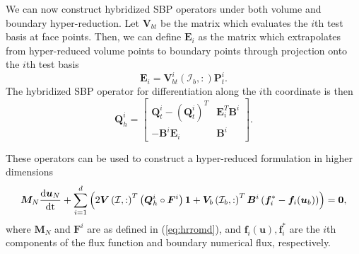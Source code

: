 \documentclass[review]{siamart171218}
\theoremstyle{assumption}
\newcommand{\td}[2]{\frac{{\rm d}#1}{{\rm d}{\rm #2}}}
\newcommand{\LRp}[1]{\left( #1 \right)}
\begin{document}
We can now construct hybridized SBP operators under both volume and boundary hyper-reduction.  Let $\bm{V}_{bt}$ be the matrix which evaluates the $i$th test basis at face points.  Then, we can define $\bm{E}_i$ as the matrix which extrapolates from hyper-reduced volume points to boundary points through projection onto the $i$th test basis
\[
\bm{E}_i = \bm{V}_{bt}^i\LRp{\mathcal{I}_b,:}\bm{P}^i_t.  
\]
The hybridized SBP operator for differentiation along the $i$th coordinate is then
\[
\bm{Q}_h^i = \begin{bmatrix}
\bm{Q}^i_t - \LRp{\bm{Q}^i_t}^T & \bm{E}_i^T\bm{B}^i \\ 
-\bm{B}^i\bm{E}_i & \bm{B}^i
\end{bmatrix}.
\]

These operators can be used to construct a hyper-reduced formulation in higher dimensions
\begin{gather}
\bm{M}_N\td{\bm{u}_N}{t} + \sum_{i=1}^d \LRp{2\bm{V}\LRp{\mathcal{I},:}^T\LRp{\bm{Q}^i_h \circ \bm{F}^i}\bm{1} + \bm{V}_b\LRp{\mathcal{I}_b,:}^T\bm{B}^i\LRp{\bm{f}_i^* - \bm{f}_i(\bm{u}_b)}} = \bm{0} \label{eq:hrromdbc},%
\end{gather}
where $\bm{M}_N$ and $\bm{F}^i$ are as defined in (\ref{eq:hrromd}), and $\bm{f}_i(\bm{u}), \bm{f}_i^*$ are the $i$th components of the flux function and boundary numerical flux, respectively.  
\end{document}
